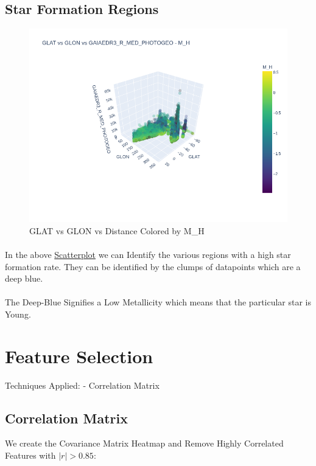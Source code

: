 \documentclass{article}
\begin{document}
\subsection{Star Formation Regions}
\begin{figure}[H]
    \centering
    \label{fig:5}
    \includegraphics[width=\textwidth]{Images/GLAT vs GLON vs Distance - M_H.png}
    \caption{GLAT vs GLON vs Distance Colored by M_H}
\end{figure}
\paragraph{}
In the above \hyperref[fig:3]{Scatterplot} we can Identify the various regions with a high star formation rate. They can be identified by the clumps of datapoints which are a deep blue.
\paragraph{}
The Deep-Blue Signifies a Low Metallicity which means that the particular star is Young.
\section{Feature Selection}\label{feature-selection}

Techniques Applied: - Correlation Matrix

\subsection{Correlation Matrix}
We create the Covariance Matrix Heatmap and Remove Highly Correlated Features with \( | r |  > 0.85 \):\\
\end{document}
